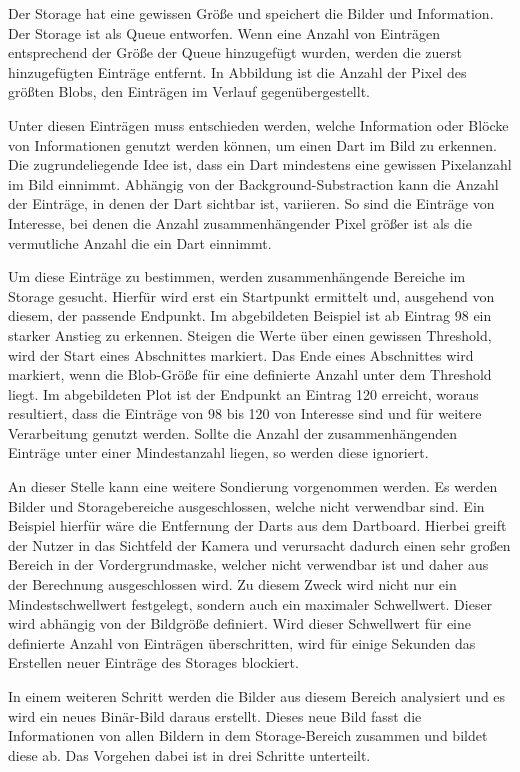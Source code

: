 Der Storage hat eine gewissen Größe und speichert die Bilder und Information. Der Storage ist als Queue entworfen. Wenn eine Anzahl von Einträgen entsprechend der Größe der Queue hinzugefügt wurden, werden die zuerst hinzugefügten Einträge entfernt. In Abbildung  ist die Anzahl der Pixel des größten Blobs, den Einträgen im Verlauf gegenübergestellt.

Unter diesen Einträgen muss entschieden werden, welche Information oder Blöcke von Informationen genutzt werden können, um einen Dart im Bild zu erkennen. Die zugrundeliegende Idee ist, dass ein Dart mindestens eine gewissen Pixelanzahl im Bild einnimmt. Abhängig von der Background-Substraction kann die Anzahl der Einträge, in denen der Dart sichtbar ist, variieren. So sind die Einträge von Interesse, bei denen die Anzahl zusammenhängender Pixel größer ist als die vermutliche Anzahl die ein Dart einnimmt.

Um diese Einträge zu bestimmen, werden zusammenhängende Bereiche im Storage gesucht. Hierfür wird erst ein Startpunkt ermittelt und, ausgehend von diesem, der passende Endpunkt.
Im abgebildeten Beispiel ist ab Eintrag 98 ein starker Anstieg zu erkennen. Steigen die Werte über einen gewissen Threshold, wird der Start eines Abschnittes markiert. Das Ende eines Abschnittes wird markiert, wenn die Blob-Größe für eine definierte Anzahl unter dem Threshold liegt. Im abgebildeten Plot ist der Endpunkt an Eintrag 120 erreicht, woraus resultiert, dass die Einträge von 98 bis 120 von Interesse sind und für weitere Verarbeitung genutzt werden. 
Sollte die Anzahl der zusammenhängenden Einträge unter einer Mindestanzahl liegen, so werden diese ignoriert.

An dieser Stelle kann eine weitere Sondierung vorgenommen werden. Es werden Bilder und Storagebereiche ausgeschlossen, welche nicht verwendbar sind.
Ein Beispiel hierfür wäre die Entfernung der Darts aus dem Dartboard. Hierbei greift der Nutzer in das Sichtfeld der Kamera und verursacht dadurch einen sehr großen Bereich in der Vordergrundmaske, welcher nicht verwendbar ist und daher aus der Berechnung ausgeschlossen wird. Zu diesem Zweck wird nicht nur ein Mindestschwellwert festgelegt, sondern auch ein maximaler Schwellwert. Dieser wird abhängig von der Bildgröße definiert. Wird dieser Schwellwert für eine definierte Anzahl von Einträgen überschritten, wird für einige Sekunden das Erstellen neuer Einträge des Storages blockiert.

In einem weiteren Schritt werden die Bilder aus diesem Bereich analysiert und es wird ein neues Binär-Bild daraus erstellt. Dieses neue Bild fasst die Informationen von allen Bildern in dem Storage-Bereich zusammen und bildet diese ab.
Das Vorgehen dabei ist in drei Schritte unterteilt.

